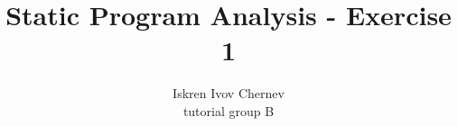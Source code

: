 \documentclass[a4paper]{article}
\begin{document}
\newcommand{\aee}[1] {[[#1]]^\sharp}
\newcommand{\cc}[1] {\texttt{#1}}

% 
% 
% 

\title{Static Program Analysis - Exercise 1}
\author{Iskren Ivov Chernev \\ tutorial group B}

\maketitle
\end{document}
